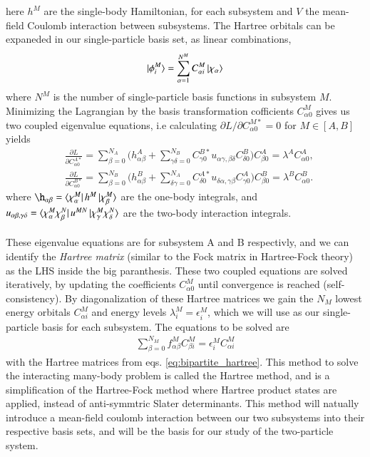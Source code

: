\documentclass{subfiles}
\begin{document}
here $h^M$ are the single-body Hamiltonian, for each subsystem and $V$ the mean-field Coulomb interaction between subsystems. The Hartree orbitals can be expaneded in our single-particle basis set, as linear combinations, 
\begin{align*}
    \ket{\phi^M_i} = \sum_{\alpha=1}^{N^M} C^M_{\alpha i}\ket{\chi_\alpha}
\end{align*}
where $N^M$ is the number of single-particle basis functions in subsystem $M$. Minimizing the Lagrangian by the basis transformation cofficients $C_{\alpha 0}^M$ gives us two coupled eigenvalue equations, i.e calculating $\partial L/\partial C_{\alpha 0}^{M*} = 0$ for $M\in[A,B]$ yields
\begin{align}
    &\frac{\partial L}{\partial C_{\alpha 0}^{A*}}  = \sum_{\beta=0}^{N_A}\big(h_{\alpha\beta}^A + \sum^{N_B}_{\gamma\delta=0}C^{B*}_{\gamma0} u_{\alpha\gamma,\beta\delta}C^B_{\delta0} \big)C^A_{\beta 0}  = \lambda^AC^A_{\alpha 0},\nonumber \\
    &\frac{\partial L}{\partial C_{\alpha 0}^{B*}}  = \sum_{\beta=0}^{N_B}\big(h_{\alpha\beta}^B + \sum^{N_A}_{\delta\gamma=0}C^{A*}_{\delta0} u_{\delta\alpha,\gamma\beta}C^A_{\gamma0} \big)C^B_{\beta 0}  = \lambda^BC^B_{\alpha 0}.\label{eq:bipartite_hartree}
\end{align}
where $\h_{\alpha\beta} = \bra{\chi_\alpha^M}h^M\ket{\chi_\beta^M}$ are the one-body integrals, and $u_{\alpha\beta,\gamma\delta} = \bra{\chi_\alpha^M\chi_\beta^N}u^{MN}\ket{\chi_\gamma^M\chi_\delta^N}$ are the two-body interaction integrals.  \\\\
These eigenvalue equations are for subsystem A and B respectivly, and we can identify the \emph{Hartree matrix} (similar to the Fock matrix in Hartree-Fock theory) as the LHS inside the big paranthesis. These two coupled equations are solved iteratively, by updating the coefficients $C_{\alpha 0}^M$ until convergence is reached (self-consistency). By diagonalization of these Hartree matrices we gain the $N_M$ lowest energy orbitals $C^M_{\alpha i}$ and energy levels $\lambda^M_i=\epsilon^M_i$\cite{leinonen2024coulomb}, which we will use as our single-particle basis for each subsystem. The equations to be solved are
\begin{align*}
    \sum_{\beta=0}^{N_M} f_{\alpha\beta}^M C^M_{\beta i} = \epsilon_i^M C^M_{\alpha i}
\end{align*}
with the Hartree matrices from eqs. \ref{eq:bipartite_hartree}. This method to solve the interacting many-body problem is called the Hartree method, and is a simplification of the Hartree-Fock method where Hartree product states are applied, instead of anti-symmtric Slater determinants. This method will natually introduce a mean-field coulomb interaction between our two subsystems into their respective basis sets, and will be the basis for our study of the two-particle system.
\end{document}
